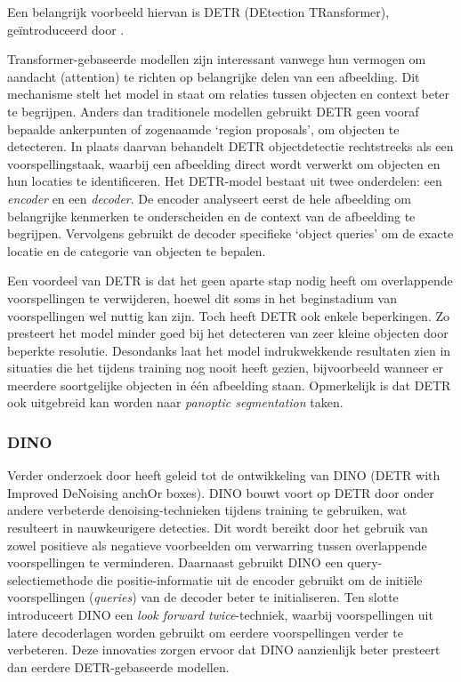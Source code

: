 Een belangrijk voorbeeld hiervan is DETR (DEtection TRansformer), geïntroduceerd door \textcite{Carion2020}.
\newline \par
Transformer-gebaseerde modellen zijn interessant vanwege hun vermogen om aandacht (attention) te richten op belangrijke delen van een afbeelding. 
Dit mechanisme stelt het model in staat om relaties tussen objecten en context beter te begrijpen.
Anders dan traditionele modellen gebruikt DETR geen vooraf bepaalde ankerpunten of zogenaamde `region proposals', om objecten te detecteren. 
In plaats daarvan behandelt DETR objectdetectie rechtstreeks als een voorspellingstaak, waarbij een afbeelding direct wordt verwerkt om objecten en hun locaties te identificeren.
Het DETR-model bestaat uit twee onderdelen: een \textit{encoder} en een \textit{decoder}. De encoder analyseert eerst de hele afbeelding om belangrijke kenmerken te onderscheiden en de context van de afbeelding te begrijpen. 
Vervolgens gebruikt de decoder specifieke `object queries' om de exacte locatie en de categorie van objecten te bepalen.
\newline \par
Een voordeel van DETR is dat het geen aparte stap nodig heeft om overlappende voorspellingen te verwijderen, hoewel dit soms in het beginstadium van voorspellingen wel nuttig kan zijn.
Toch heeft DETR ook enkele beperkingen. Zo presteert het model minder goed bij het detecteren van zeer kleine objecten door beperkte resolutie. 
Desondanks laat het model indrukwekkende resultaten zien in situaties die het tijdens training nog nooit heeft gezien, bijvoorbeeld wanneer er meerdere soortgelijke objecten in één afbeelding staan.
Opmerkelijk is dat DETR ook uitgebreid kan worden naar \textit{panoptic segmentation} taken.

\subsubsection{DINO}

Verder onderzoek door \textcite{Zhang2022} heeft geleid tot de ontwikkeling van DINO (DETR with Improved DeNoising anchOr boxes). 
DINO bouwt voort op DETR door onder andere verbeterde denoising-technieken tijdens training te gebruiken, wat resulteert in nauwkeurigere detecties. 
Dit wordt bereikt door het gebruik van zowel positieve als negatieve voorbeelden om verwarring tussen overlappende voorspellingen te verminderen. 
Daarnaast gebruikt DINO een query-selectiemethode die positie-informatie uit de encoder gebruikt om de initiële voorspellingen (\textit{queries}) van de decoder beter te initialiseren. 
Ten slotte introduceert DINO een \textit{look forward twice}-techniek, waarbij voorspellingen uit latere decoderlagen worden gebruikt om eerdere voorspellingen verder te verbeteren. 
Deze innovaties zorgen ervoor dat DINO aanzienlijk beter presteert dan eerdere DETR-gebaseerde modellen.

